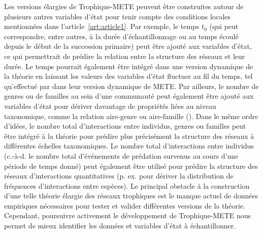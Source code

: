 Les versions élargies de Trophique-METE peuvent être construites autour de
plusieurs autres variables d'état pour tenir compte des conditions locales
mentionnées dans l'article~\ref{art:article1}. Par exemple, le temps $t_0$ (qui
peut correspondre, entre autres, à la durée d'échantillonnage ou au temps écoulé
depuis le début de la succession primaire) peut être ajouté aux variables
d'état, ce qui permettrait de prédire la relation entre la structure des réseaux
et leur durée. Le temps pourrait également être intégré dans une version
dynamique de la théorie en laissant les valeurs des variables d'état fluctuer au
fil du temps, tel qu'effectué par \textcite{Harte2021Dynamete} dans leur version
dynamique de METE. Par ailleurs, le nombre de genres ou de familles au sein
d'une communauté peut également être ajouté aux variables d'état pour dériver
davantage de propriétés liées au niveau taxonomique, comme la relation
aire-genre ou aire-famille (\cite{Harte2014Maximum}). Dans le même ordre
d'idées, le nombre total d'interactions entre individus, genres ou familles peut
être intégré à la théorie pour prédire plus précisément la structure des réseaux
à différentes échelles taxonomiques. Le nombre total d'interactions entre
individus (c.-à-d. le nombre total d'événements de prédation survenus au cours
d'une période de temps donné) peut également être utilisé pour prédire la
structure des réseaux d'interactions quantitatives (p. ex. pour dériver la
distribution de fréquences d'interactions entre espèces). Le principal obstacle
à la construction d'une telle théorie élargie des réseaux trophiques est le
manque actuel de données empiriques nécessaires pour tester et valider
différentes versions de la théorie. Cependant, poursuivre activement le
développement de Trophique-METE nous permet de mieux identifier les données et
variables d'état à échantillonner. 

